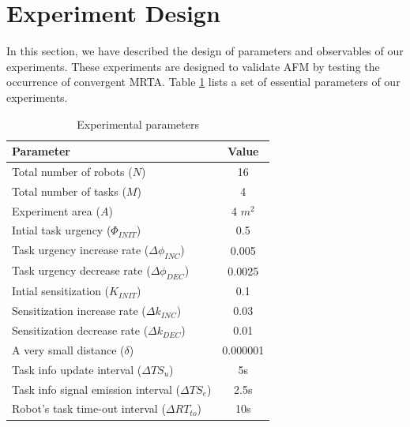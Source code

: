 \documentclass[letterpaper, 10 pt, times, conference]{ieeeconf} %
\begin{document}
\section{Experiment Design}
\label{sec:expt-design}
In this section, we have described the design of parameters and observables of our experiments.
These experiments are designed to validate AFM by testing the occurrence of convergent MRTA. Table \ref{table:params} lists a set of essential parameters of our experiments. 
%
\begin{table}
\caption{Experimental parameters}
\label{table:params}
\begin{center}
\begin{tabular}{|l||c|}
\hline Parameter & Value\\
\hline Total number of robots ($N$) & 16\\
\hline Total number of tasks ($M$) & 4\\
\hline Experiment area ($A$) & 4 $m^2$\\
\hline Intial task urgency ($\Phi_{INIT}$) & 0.5\\
\hline Task urgency increase rate ($\Delta\phi_{INC}$) & 0.005\\
\hline Task urgency decrease rate ($\Delta\phi_{DEC}$) & 0.0025\\
\hline Intial sensitization ($K_{INIT}$) & 0.1\\
\hline Sensitization increase rate ($\Delta k_{INC}$) & 0.03\\
\hline Sensitization decrease rate ($\Delta k_{DEC}$) & 0.01\\
\hline A very small distance ($\delta$)& 0.000001\\
\hline Task info update interval ($\Delta TS_{u}$) & 5s\\
\hline Task info signal emission interval ($ \Delta TS_{e}$)& 2.5s\\
\hline Robot's task time-out interval ($\Delta RT_{to} $)& 10s\\
\hline
\end{tabular}
\end{center}
\end{table}
\end{document}
